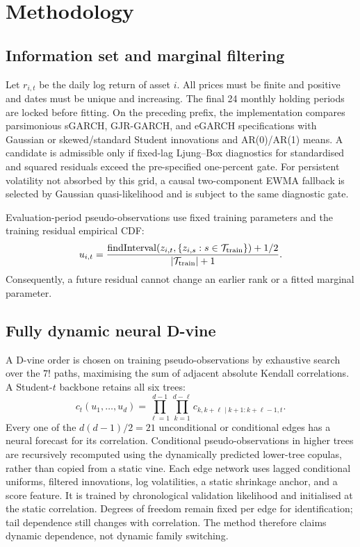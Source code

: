 \section{Methodology}
\label{sec:methodology}

\subsection{Information set and marginal filtering}

Let \(r_{i,t}\) be the daily log return of asset \(i\). All prices must be
finite and positive and dates must be unique and increasing. The final 24
monthly holding periods are locked before fitting. On the preceding prefix,
the implementation compares parsimonious sGARCH, GJR-GARCH, and eGARCH
specifications with Gaussian or skewed/standard Student innovations and
AR(0)/AR(1) means. A candidate is admissible only if fixed-lag Ljung--Box
diagnostics for standardised and squared residuals exceed the pre-specified
one-percent gate. For persistent volatility not absorbed by this grid, a
causal two-component EWMA fallback is selected by Gaussian quasi-likelihood
and is subject to the same diagnostic gate.

Evaluation-period pseudo-observations use fixed training parameters and the
training residual empirical CDF:
\[
 u_{i,t}=\frac{\operatorname{findInterval}(z_{i,t},
 \{z_{i,s}:s\in\mathcal T_{\rm train}\})+1/2}
 {|\mathcal T_{\rm train}|+1}.
\]
Consequently, a future residual cannot change an earlier rank or a fitted
marginal parameter.

\subsection{Fully dynamic neural D-vine}

A D-vine order is chosen on training pseudo-observations by exhaustive search
over the \(7!\) paths, maximising the sum of adjacent absolute Kendall
correlations. A Student-\(t\) backbone retains all six trees:
\[
 c_t(u_1,\ldots,u_d)=
 \prod_{\ell=1}^{d-1}\prod_{k=1}^{d-\ell}
 c_{k,k+\ell\mid k+1:k+\ell-1,t}.
\]
Every one of the \(d(d-1)/2=21\) unconditional or conditional edges has a
neural forecast for its correlation. Conditional pseudo-observations in
higher trees are recursively recomputed using the dynamically predicted
lower-tree copulas, rather than copied from a static vine. Each edge network
uses lagged conditional uniforms, filtered innovations, log volatilities, a
static shrinkage anchor, and a score feature. It is trained by chronological
validation likelihood and initialised at the static correlation. Degrees of
freedom remain fixed per edge for identification; tail dependence still
changes with correlation. The method therefore claims dynamic dependence,
not dynamic family switching.


